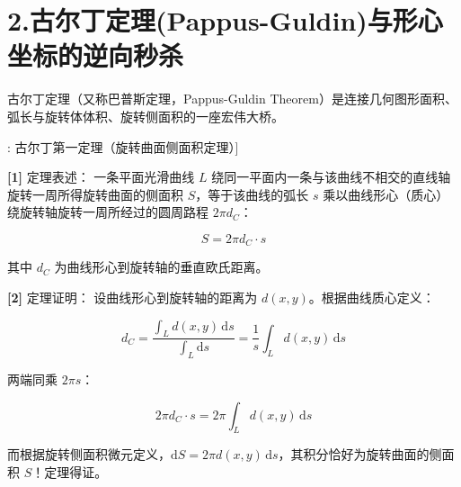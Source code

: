 \documentclass[11pt,a4paper,UTF8]{ctexart}
\begin{document}
\section{2.古尔丁定理(Pappus-Guldin)与形心坐标的逆向秒杀}

古尔丁定理（又称巴普斯定理，Pappus-Guldin Theorem）是连接几何图形面积、弧长与旋转体体积、旋转侧面积的一座宏伟大桥。

\begin{thmbox}[模型[3]: 古尔丁第一定理（旋转曲面侧面积定理）]

\textbf{[1]} 定理表述：
一条平面光滑曲线 $L$ 绕同一平面内一条与该曲线不相交的直线轴旋转一周所得旋转曲面的侧面积 $S$，等于该曲线的弧长 $s$ 乘以曲线形心（质心）绕旋转轴旋转一周所经过的圆周路程 $2\pi d_C$：


\begin{equation*}
S = 2\pi d_C \cdot s
\end{equation*}


其中 $d_C$ 为曲线形心到旋转轴的垂直欧氏距离。

\textbf{[2]} 定理证明：
设曲线形心到旋转轴的距离为 $d(x, y)$。根据曲线质心定义：


\begin{equation*}
d_C = \frac{\int_L d(x, y)\,\mathrm{d}s}{\int_L \mathrm{d}s} = \frac{1}{s}\int_L d(x, y)\,\mathrm{d}s
\end{equation*}


两端同乘 $2\pi s$：


\begin{equation*}
2\pi d_C \cdot s = 2\pi \int_L d(x, y)\,\mathrm{d}s
\end{equation*}


而根据旋转侧面积微元定义，$\mathrm{d}S = 2\pi d(x, y)\,\mathrm{d}s$，其积分恰好为旋转曲面的侧面积 $S$！定理得证。

\end{thmbox}
\end{document}

